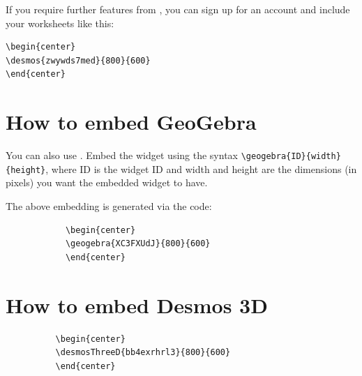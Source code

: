 \documentclass{ximera}
\begin{document}
If you require further features from
, you can sign up for an account
and include your worksheets like this:

\begin{verbatim}
\begin{center}
\desmos{zwywds7med}{800}{600}
\end{center}
\end{verbatim}
\begin{center}
\end{center}


  \section{How to embed GeoGebra}

        You can also use . Embed the
        widget using the syntax \verb|\geogebra{ID}{width}{height}|, where ID
        is the widget ID and width and height are the dimensions (in pixels)
        you want the embedded widget to have.
        
    
        \begin{center}
        \end{center}
        
        The above embedding is generated via the code:
        
        \begin{verbatim}
            \begin{center}
            \geogebra{XC3FXUdJ}{800}{600}
            \end{center}
        \end{verbatim}      

        \section{How to embed Desmos 3D}

        \begin{center}
        \end{center}
        \begin{verbatim}
          \begin{center}
          \desmosThreeD{bb4exrhrl3}{800}{600}
          \end{center}
      \end{verbatim}    
      
\end{document}
